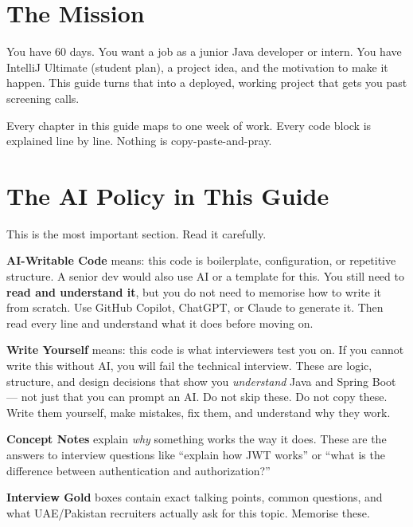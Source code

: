 \documentclass[12pt,a4paper]{report}
\begin{document}
\section{The Mission}

You have 60 days. You want a job as a junior Java developer or intern. You have IntelliJ Ultimate (student plan), a project idea, and the motivation to make it happen. This guide turns that into a deployed, working project that gets you past screening calls.

Every chapter in this guide maps to one week of work. Every code block is explained line by line. Nothing is copy-paste-and-pray.

\section{The AI Policy in This Guide}

This is the most important section. Read it carefully.

\begin{tcolorbox}[aibox]
\textbf{AI-Writable Code} means: this code is boilerplate, configuration, or repetitive structure. A senior dev would also use AI or a template for this. You still need to \textbf{read and understand it}, but you do not need to memorise how to write it from scratch. Use GitHub Copilot, ChatGPT, or Claude to generate it. Then read every line and understand what it does before moving on.
\end{tcolorbox}

\begin{tcolorbox}[handbox]
\textbf{Write Yourself} means: this code is what interviewers test you on. If you cannot write this without AI, you will fail the technical interview. These are logic, structure, and design decisions that show you \textit{understand} Java and Spring Boot --- not just that you can prompt an AI. Do not skip these. Do not copy these. Write them yourself, make mistakes, fix them, and understand why they work.
\end{tcolorbox}

\begin{tcolorbox}[notebox]
\textbf{Concept Notes} explain \textit{why} something works the way it does. These are the answers to interview questions like ``explain how JWT works'' or ``what is the difference between authentication and authorization?''
\end{tcolorbox}

\begin{tcolorbox}[interviewbox]
\textbf{Interview Gold} boxes contain exact talking points, common questions, and what UAE/Pakistan recruiters actually ask for this topic. Memorise these.
\end{tcolorbox}
\end{document}
